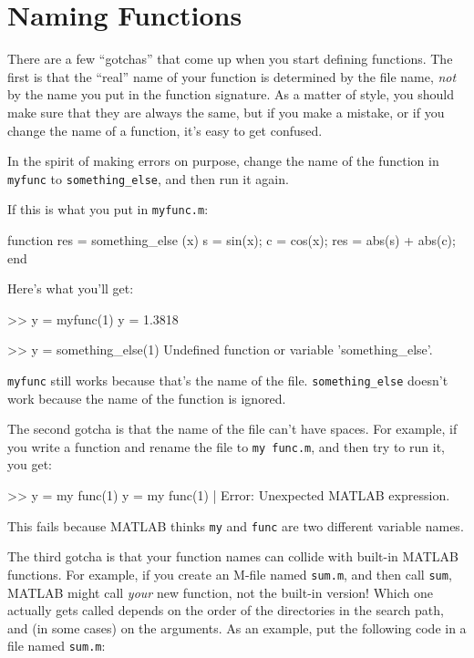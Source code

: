 
\section{Naming Functions}

There are a few ``gotchas'' that come up when you start defining functions.
The first is that the ``real'' name of your function is determined by the file name, {\em not} by the name you put in the function signature.  As a matter of style, you
should make sure that they are always the same, but if you
make a mistake, or if you change the name of a function, it's
easy to get confused.


In the spirit of making errors on purpose, change the name of
the function in \verb"myfunc" to \verb"something_else", and
then run it again.

If this is what you put in \verb"myfunc.m":

\begin{code}
function res = something_else (x)
    s = sin(x);
    c = cos(x);
    res = abs(s) + abs(c);
end
\end{code}

Here's what you'll get:

\begin{code}
>> y = myfunc(1)
y = 1.3818

>> y = something_else(1)
Undefined function or variable 'something_else'.
\end{code}

{\tt myfunc} still works because that's the name of the file.
\verb"something_else" doesn't work because the name of the function is ignored.

The second gotcha is that the name of the file can't have spaces.
For example, if you write a function and rename the file to 
{\tt my func.m},
and then try to run it, you get:

\begin{code}
>> y = my func(1)
 y = my func(1)
        |
Error: Unexpected MATLAB expression.
\end{code}

This fails because MATLAB thinks \verb"my" and \verb"func" are two different
variable names.

The third gotcha is that your function names can collide with built-in
MATLAB functions.  For example, if you create an M-file named {\tt sum.m}, and then call {\tt sum}, MATLAB might call {\em your} new
function, not the built-in version!  Which one actually gets called
depends on the order of the directories in the search path, and
(in some cases) on the arguments.  As an example, put the following
code in a file named {\tt sum.m}:

